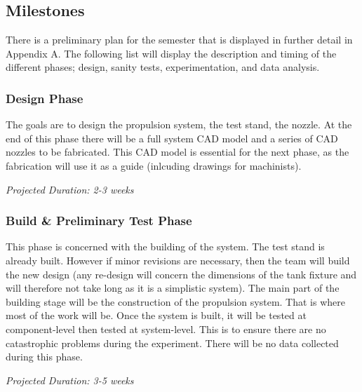 \documentclass[conference]{IEEEtran} %
\begin{document}
\subsection{Milestones}
\label{subsec:milestones}

There is a preliminary plan for the semester that is displayed in further detail in Appendix A. The following list will display the description and timing
of the different phases; design, sanity tests, experimentation, and data analysis.

\subsubsection{Design Phase}
\label{subsubsec: design phase}
    The goals are to design the propulsion system, the test stand, the nozzle. At the end of this phase
    there will be a full system CAD model and a series of CAD nozzles to be fabricated. This CAD model is essential for the next phase, as the fabrication
    will use it as a guide (inlcuding drawings for machinists).

    \textit{Projected Duration: 2-3 weeks}

\subsubsection{Build \& Preliminary Test Phase}
\label{subsubsec: sanity test phase}
    This phase is concerned with the building of the system. The test stand is already built. However if minor revisions are necessary, then the team will
    build the new design (any re-design will concern the dimensions of the tank fixture and will therefore not take long as it is a simplistic system).
    The main part of the building stage will be the construction of the propulsion system. That is where most of the work will be. Once the system is built,
    it will be tested at component-level then tested at system-level. This is to ensure there are no catastrophic problems during the experiment.
    There will be no data collected during this phase.

    \textit{Projected Duration: 3-5 weeks}
\end{document}
